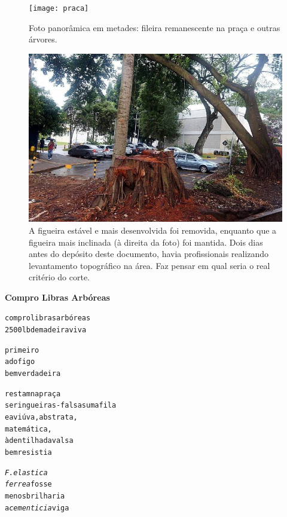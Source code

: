 \documentclass[doutorado, pos-defesa, spanish, english, brazil, versalete, sumario=tradicional]{packages/icmc}
\begin{document}
\begin{anexosenv}
\begin{landscape}
\begin{figure}
\centering
\texttt{[image: praca]}
\caption*{Foto panorâmica em metades: fileira remanescente na praça e outras árvores.}
\end{figure}
\end{landscape}

\begin{landscape}
\begin{figure}
\centering
\includegraphics{figue}
\caption*{A figueira estável e mais desenvolvida foi removida, enquanto que a figueira mais inclinada (à direita da foto) foi mantida. Dois dias antes do depósito deste documento, havia profissionais realizando  levantamento topográfico na área. Faz pensar em qual seria o real critério do corte.}
\end{figure}
\end{landscape}

\newpage
\textbf{Compro Libras Arbóreas}
\begin{alltt}
          compro libras arbóreas
       2500lb            de madeira viva
            
               primeiro
               a do figo
               bem verdadeira
               
               restam na praça               
               seringueiras-falsas    uma fila
               e a viúva, abstrata,
              matemática, 
              à dentilhada valsa
              bem resistia

              \textit{F. elastica}
              \textit{ferrea} fosse
              menos brilharia
              a \textit{cementicia} viga


\end{alltt}
\end{anexosenv}
\end{document}
